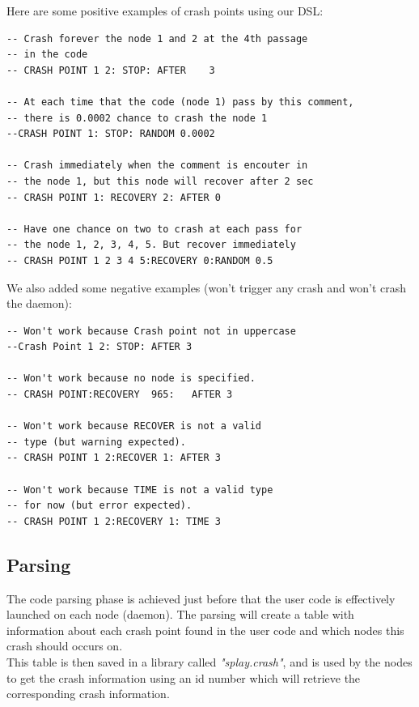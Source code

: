 \documentclass{eplmastersthesis}
\begin{document}
          Here are some positive examples of crash points using our DSL:

          \begin{lstlisting}[style=MyLua]
-- Crash forever the node 1 and 2 at the 4th passage
-- in the code
-- CRASH POINT 1 2: STOP: AFTER    3

-- At each time that the code (node 1) pass by this comment,
-- there is 0.0002 chance to crash the node 1
--CRASH POINT 1: STOP: RANDOM 0.0002

-- Crash immediately when the comment is encouter in
-- the node 1, but this node will recover after 2 sec
-- CRASH POINT 1: RECOVERY 2: AFTER 0

-- Have one chance on two to crash at each pass for
-- the node 1, 2, 3, 4, 5. But recover immediately
-- CRASH POINT 1 2 3 4 5:RECOVERY 0:RANDOM 0.5
            \end{lstlisting}

          We also added some negative examples (won't trigger any crash
          and won't crash the daemon):

          \begin{lstlisting}[style=MyLua]
-- Won't work because Crash point not in uppercase
--Crash Point 1 2: STOP: AFTER 3

-- Won't work because no node is specified.
-- CRASH POINT:RECOVERY  965:   AFTER 3

-- Won't work because RECOVER is not a valid
-- type (but warning expected).
-- CRASH POINT 1 2:RECOVER 1: AFTER 3

-- Won't work because TIME is not a valid type
-- for now (but error expected).
-- CRASH POINT 1 2:RECOVERY 1: TIME 3
          \end{lstlisting}

        \subsection{Parsing}

          The code parsing phase is achieved just before that the user code
          is effectively launched on each node (daemon). The parsing will
          create a table with information about each crash point found in the
          user code and which nodes this crash should occurs on.\\
          This table is then saved in a library called \textit{"splay.crash"},
          and is used by the nodes to get the crash information using an id
          number which will retrieve the corresponding crash information.\\
\end{document}

